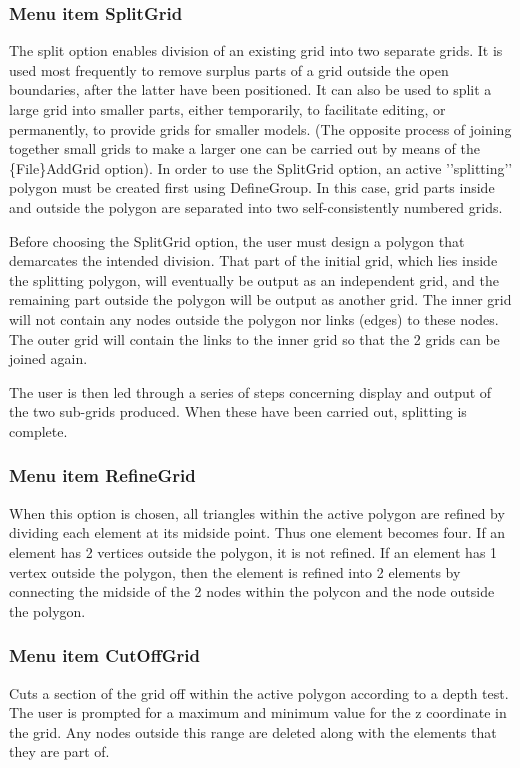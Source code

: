 \documentclass{article}
\begin{document}
\subsubsection[Menu item SplitGrid]{Menu item SplitGrid}
The split option enables division of an existing grid into two separate grids. It is used most frequently to remove surplus parts of a grid outside the open boundaries, after the latter have been positioned. It can also be used to split a large grid into smaller parts, either temporarily, to facilitate editing, or permanently, to provide grids for smaller models. (The opposite process of joining together small grids to make a larger one can be carried out by means of the \{File\}AddGrid option). In order to use the SplitGrid option, an active '{}'splitting'{}' polygon must be created first using DefineGroup. In this case, grid parts inside and outside the polygon are separated into two self-consistently numbered grids. 

Before choosing the SplitGrid option, the user must design a polygon that demarcates the intended division. That part of the initial grid, which lies inside the splitting polygon, will eventually be output as an independent grid, and the remaining part outside the polygon will be output as another grid. The inner grid will not contain any nodes outside the polygon nor links (edges) to these nodes. The outer grid will contain the links to the inner grid so that the 2 grids can be joined again. 

The user is then led through a series of steps concerning display and output of the two sub-grids produced. When these have been carried out, splitting is complete.

\subsubsection[Menu item RefineGrid]{Menu item RefineGrid}
When this option is chosen, all triangles within the active polygon are refined by dividing each element at its midside point. Thus one element becomes four. If an element has 2 vertices outside the polygon, it is not refined. If an element has 1 vertex outside the polygon, then the element is refined into 2 elements by connecting the midside of the 2 nodes within the polycon and the node outside the polygon.

\subsubsection[Menu item CutOffGrid]{Menu item CutOffGrid}
Cuts a section of the grid off within the active polygon according to a depth test. The user is prompted for a maximum and minimum value for the z coordinate in the grid. Any nodes outside this range are deleted along with the elements that they are part of.
\end{document}
